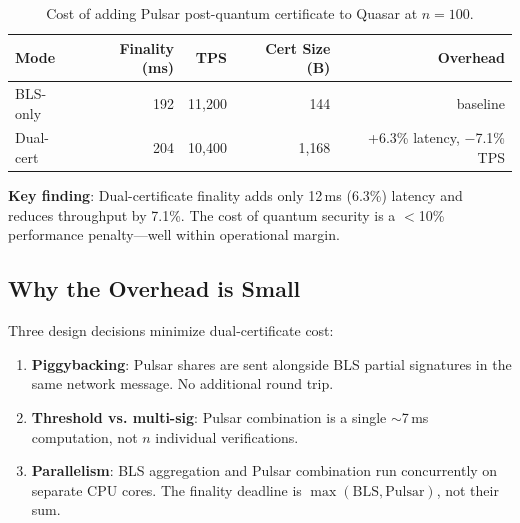 \begin{table}[h]
\centering
\begin{tabular}{@{}lrrrr@{}}
\toprule
\textbf{Mode} & \textbf{Finality (ms)} & \textbf{TPS} & \textbf{Cert Size (B)} & \textbf{Overhead} \\
\midrule
BLS-only   & 192  & 11{,}200  & 144     & baseline \\
Dual-cert  & 204  & 10{,}400  & 1{,}168 & +6.3\% latency, $-$7.1\% TPS \\
\bottomrule
\end{tabular}
\caption{Cost of adding Pulsar post-quantum certificate to Quasar at $n=100$.}
\label{tab:dual-overhead}
\end{table}

\textbf{Key finding}: Dual-certificate finality adds only 12\,ms (6.3\%) latency and
reduces throughput by 7.1\%. The cost of quantum security is a $<$10\% performance
penalty---well within operational margin.

\subsection{Why the Overhead is Small}

Three design decisions minimize dual-certificate cost:

\begin{enumerate}
\item \textbf{Piggybacking}: Pulsar shares are sent alongside BLS partial signatures
      in the same network message. No additional round trip.
\item \textbf{Threshold vs. multi-sig}: Pulsar combination is a single $\sim$7\,ms
      computation, not $n$ individual verifications.
\item \textbf{Parallelism}: BLS aggregation and Pulsar combination run concurrently
      on separate CPU cores. The finality deadline is
      $\max(\text{BLS}, \text{Pulsar})$, not their sum.
\end{enumerate}

